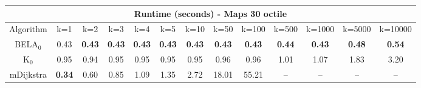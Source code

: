 \begin{tabular}{c|cccccccccccc}\toprule
\multicolumn{13}{c}{Runtime (seconds) - Maps 30 octile}\\ \midrule
Algorithm & k=1 & k=2 & k=3 & k=4 & k=5 & k=10 & k=50 & k=100 & k=500 & k=1000 & k=5000 & k=10000 \\ \midrule
BELA$_0$ & 0.43 & \textbf{0.43} & \textbf{0.43} & \textbf{0.43} & \textbf{0.43} & \textbf{0.43} & \textbf{0.43} & \textbf{0.43} & \textbf{0.44} & \textbf{0.43} & \textbf{0.48} & \textbf{0.54} \\
K$_0$ & 0.95 & 0.94 & 0.95 & 0.95 & 0.95 & 0.95 & 0.96 & 0.96 & 1.01 & 1.07 & 1.83 & 3.20 \\
mDijkstra & \textbf{0.34} & 0.60 & 0.85 & 1.09 & 1.35 & 2.72 & 18.01 & 55.21 & -- & -- & -- & -- \\ \bottomrule 
\end{tabular}
